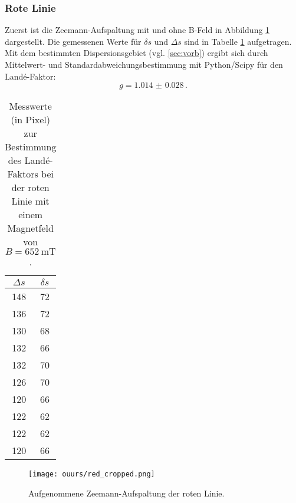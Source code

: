 \subsubsection{Rote Linie}
	Zuerst ist die Zeemann-Aufspaltung mit und ohne B-Feld in Abbildung \ref{fig:roterstern}
	dargestellt.
	Die gemessenen Werte für $\delta s$ und $\Delta s$ sind in Tabelle \ref{tab:rot}
	aufgetragen. Mit dem bestimmten Dispersionsgebiet (vgl. \ref{sec:vorb}) ergibt sich
	durch Mittelwert- und Standardabweichungsbestimmung mit Python/Scipy \cite{scipy} für
	den Landé-Faktor:
	\begin{equation*}
		g = \SI{1.014(28)} \, \text{.}
	\end{equation*}
	\begin{table}
		\centering
		\caption{Messwerte (in Pixel) zur Bestimmung des Landé-Faktors bei der roten Linie mit einem Magnetfeld von $B = \SI{652}{\milli\tesla}$.}
		\label{tab:rot}
		\begin{tabular}{c | c}
			\toprule
			$\Delta s$ & $\delta s$\\
			\midrule
			148 & 72 \\
			136 & 72 \\
			130 & 68 \\
			132 & 66 \\
			132 & 70 \\
			126 & 70 \\
			120 & 66 \\
			122 & 62 \\
			122 & 62 \\
			120 & 66 \\
			\bottomrule
		\end{tabular}
	\end{table}
\begin{figure}
	\centering
	\texttt{[image: ouurs/red\_cropped.png]}
	\caption{Aufgenommene Zeemann-Aufspaltung der roten Linie.}
	\label{fig:roterstern}
\end{figure}

\FloatBarrier
